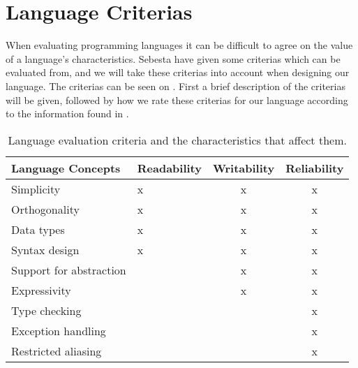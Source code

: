 \chapter{Language Criterias}
When evaluating programming languages it can be difficult to agree on the value of a language's characteristics.
 Sebesta have given some criterias which can be evaluated from, and we will take these criterias into account when designing our language.\citep{Sebesta}
The criterias can be seen on .
First a brief description of the criterias will be given, followed by how we rate these criterias for our language according to the information found in .
\begin{table}[h]
	\centering
	\begin{tabular}{|l|l|c|c|}
	\hline
	\textbf{Language Concepts}										& \textbf{Readability}  & \textbf{Writability} & \textbf{Reliability}   \\ \hline
	Simplicity                                                  	& x 					& x             		 & x           			\\ \hline
	Orthogonality                                               	& x 					& x             		 & x           			\\ \hline
	Data types                                                  	& x 					& x             		 & x           			\\ \hline
	Syntax design                                               	& x 					& x             		 & x           			\\ \hline
	Support for abstraction                                    		&                       & x             		 & x           			\\ \hline
	Expressivity                                                	&                       & x             		 & x           			\\ \hline
	Type checking                                               	&                       &            			 & x           			\\ \hline
	Exception handling                                          	&                       &             			 & x           			\\ \hline
	Restricted aliasing                                         	&                       &             			 & x           			\\ \hline
	\end{tabular}
	\caption{Language evaluation criteria and the characteristics that affect them.}
	\label{tbl:concepts}
\end{table}

